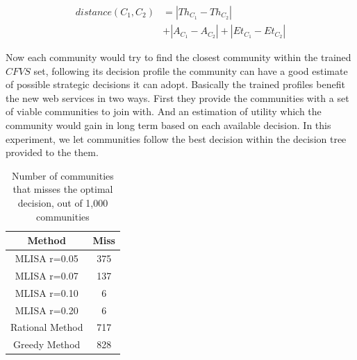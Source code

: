\documentclass[10pt,journal,cspaper,compsoc]{IEEEtran}
\begin{document}
\begin{equation}\label{distance_c}
\begin{split}
distance (C_1, C_2) & = |Th_{C_1} - Th_{C_2}| \\
                    & + |A_{C_1} - A_{C_2}| + |Et_{C_1} - Et_{C_2}|
\end{split}
\end{equation}

Now each community would try to find the closest community within the trained $CFVS$ set, following its decision profile the community can have a good estimate of possible strategic decisions it can adopt. Basically the trained profiles benefit the new web services in two ways. First they provide the communities with a set of viable communities to join with. And an estimation of utility which the community would gain in long term based on each available decision. In this experiment, we let communities follow the best decision within the decision tree provided to the them. 

\begin{table}[h]
\begin{tabular}{|c|c|}
\hline
 Method&Miss\\ \hline
 MLISA r=0.05& 375 \\ \hline
 MLISA r=0.07& 137 \\ \hline
 MLISA r=0.10& 6 \\ \hline
 MLISA r=0.20& 6 \\ \hline
Rational Method& 717 \\ \hline
Greedy Method& 828 \\ \hline
\end{tabular}
\caption{Number of communities that misses the optimal decision, out of 1,000 communities}
\label{fail_rate}
\end{table}
\end{document}
